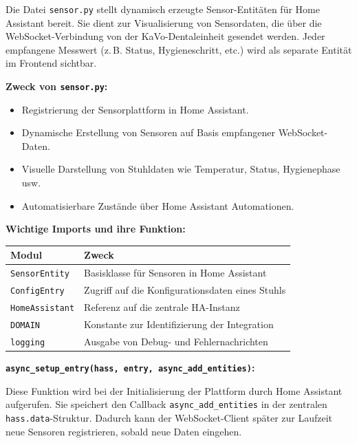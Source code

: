 Die Datei \texttt{sensor.py} stellt dynamisch erzeugte Sensor-Entitäten für Home Assistant bereit. Sie dient zur Visualisierung von Sensordaten, die über die WebSocket-Verbindung von der KaVo-Dentaleinheit gesendet werden. Jeder empfangene Messwert (z.\,B. Status, Hygieneschritt, etc.) wird als separate Entität im Frontend sichtbar.

\vspace{0.5cm}

\textbf{Zweck von \texttt{sensor.py}:}

\begin{itemize}
  \item Registrierung der Sensorplattform in Home Assistant.\\
  \item Dynamische Erstellung von Sensoren auf Basis empfangener WebSocket-Daten.\\
  \item Visuelle Darstellung von Stuhldaten wie Temperatur, Status, Hygienephase usw.\\
  \item Automatisierbare Zustände über Home Assistant Automationen.
\end{itemize}

\vspace{0.5cm}

\textbf{Wichtige Imports und ihre Funktion:}

\begin{tabular}{|p{5.5cm}|p{8.5cm}|}
\hline
\textbf{Modul} & \textbf{Zweck} \\
\hline
\texttt{SensorEntity} & Basisklasse für Sensoren in Home Assistant \\
\texttt{ConfigEntry} & Zugriff auf die Konfigurationsdaten eines Stuhls \\
\texttt{HomeAssistant} & Referenz auf die zentrale HA-Instanz \\
\texttt{DOMAIN} & Konstante zur Identifizierung der Integration \\
\texttt{logging} & Ausgabe von Debug- und Fehlernachrichten \\
\hline
\end{tabular}

\vspace{0.5cm}

\textbf{\texttt{async\_setup\_entry(hass, entry, async\_add\_entities)}:}

Diese Funktion wird bei der Initialisierung der Plattform durch Home Assistant aufgerufen. Sie speichert den Callback \texttt{async\_add\_entities} in der zentralen \texttt{hass.data}-Struktur. Dadurch kann der WebSocket-Client später zur Laufzeit neue Sensoren registrieren, sobald neue Daten eingehen.

